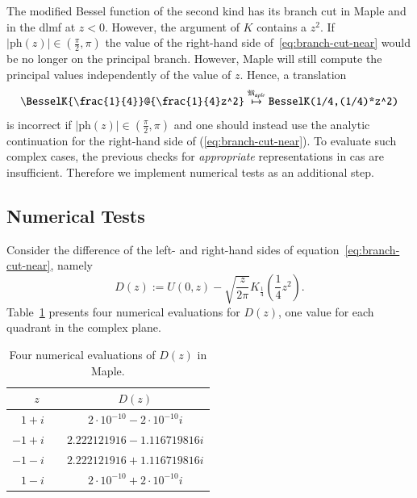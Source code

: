\documentclass[a4paper,11pt]{article}
\newcommand{\Maple}{Maple}
\newcommand{\langMaple}{\mathfrak{M}_{aple}}
\newcommand{\tableRowSpace}{\rule{0pt}{0.9\normalbaselineskip}}
\theoremstyle{defTheoStyle}
\theoremstyle{defExampStyle}
\DeclareRobustCommand{\cpi}{{\pi}}
\DeclareRobustCommand{\iunit}{{i}}
\newcommand{\ph}[1]{\mathrm{ph}\!\left(#1\right)}
\begin{document}
The modified Bessel function of the second kind has its branch cut in \Maple{} and in the \gls*{dlmf} at $z < 0$. However, the argument of $K$ contains a $z^2$. If $|\ph{z}| \in \left(\frac{\cpi}{2}, \cpi\right)$ the value of the right-hand side of~\eqref{eq:branch-cut-near} would be no longer on the principal branch. However, \Maple{} will still compute the principal values independently of the value of $z$. Hence, a translation
\begin{equation}
\verb|\BesselK{\frac{1}{4}}@{\frac{1}{4}z^2}| \overset{\langMaple}{\mapsto} \verb|BesselK(1/4,(1/4)*z^2)|
\end{equation}
is incorrect if $|\ph{z}| \in \left(\frac{\cpi}{2}, \cpi\right)$ and one should instead use the analytic continuation for the right-hand side of (\ref{eq:branch-cut-near}). 
To evaluate such complex cases, the previous checks for {\it appropriate} representations in \gls*{cas} are insufficient. Therefore we implement numerical tests as an additional step.

\subsection{Numerical Tests}\label{sec:numerical-tests}
Consider the difference of the left- and right-hand sides of equation~\eqref{eq:branch-cut-near}, namely
\begin{equation}\label{eq:difference}
D(z) := U(0,z) - \sqrt{\frac{z}{2\cpi}} K_{\frac{1}{4}}\left(\frac{1}{4}z^2\right).
\end{equation}
Table~\ref{tab:computations-for-difference} presents four numerical evaluations for $D(z)$, one value for each quadrant in the complex plane.
\begin{table}[ht]
\centering
\begin{tabular}{rcc}
	\hline
	$z\ \ $ & & $D(z)$\\
	\hline
	\tableRowSpace{} $1+\iunit$ & & $2 \cdot 10^{-10} - 2 \cdot 10^{-10} \iunit$\\
	$-1+\iunit$& & $2.222121916 - 1.116719816 \iunit$\\
	$-1-\iunit$& & $2.222121916 + 1.116719816 \iunit$\\
	$1-\iunit$ & & $2 \cdot 10^{-10} + 2 \cdot 10^{-10} \iunit$\\
	\hline
\end{tabular}
\caption{Four numerical evaluations of $D(z)$ in \Maple.}
\label{tab:computations-for-difference}
\end{table}
\end{document}
